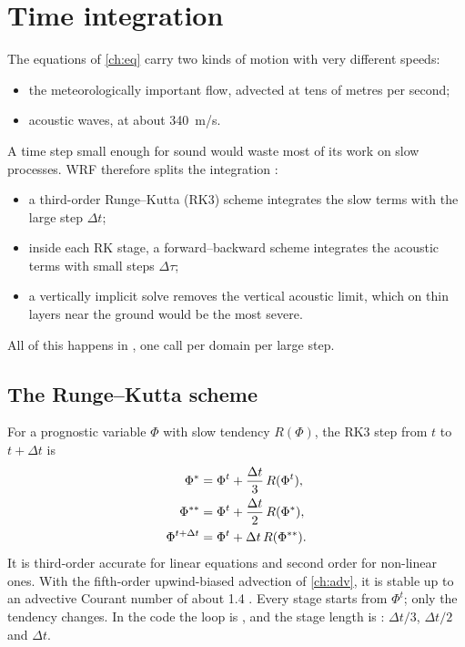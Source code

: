 \chapter{Time integration}\label{ch:time}

The equations of \cref{ch:eq} carry two kinds of motion with very different speeds:
\begin{itemize}
  \item the meteorologically important flow, advected at tens of metres per second;
  \item acoustic waves, at about 340~m/s.
\end{itemize}
A time step small enough for sound would waste most of its work on slow processes. WRF therefore splits the
integration \citep{wicker2002,klemp2007}:
\begin{itemize}
  \item a third-order Runge--Kutta (RK3) scheme integrates the slow terms with the large step $\Delta t$;
  \item inside each RK stage, a forward--backward scheme integrates the acoustic terms with small steps $\Delta\tau$;
  \item a vertically implicit solve removes the vertical acoustic limit, which on thin layers near the ground would
    be the most severe.
\end{itemize}
All of this happens in , one call per domain per large step.

\section{The Runge--Kutta scheme}

For a prognostic variable $\Phi$ with slow tendency $R(\Phi)$, the RK3 step from $t$ to $t + \Delta t$ is
\begin{align}
  \Phi^{*}  &= \Phi^{t} + \frac{\Delta t}{3}\,R(\Phi^{t}), \notag\\
  \Phi^{**} &= \Phi^{t} + \frac{\Delta t}{2}\,R(\Phi^{*}), \label{eq:rk3}\\
  \Phi^{t+\Delta t} &= \Phi^{t} + \Delta t\,R(\Phi^{**}). \notag
\end{align}
It is third-order accurate for linear equations and second order for non-linear ones. With the fifth-order
upwind-biased advection of \cref{ch:adv}, it is stable up to an advective Courant number of about 1.4
\citep{wicker2002}. Every stage starts from $\Phi^t$; only the tendency changes. In the code the loop is
, and the stage length is : $\Delta t/3$,
$\Delta t/2$ and $\Delta t$.

